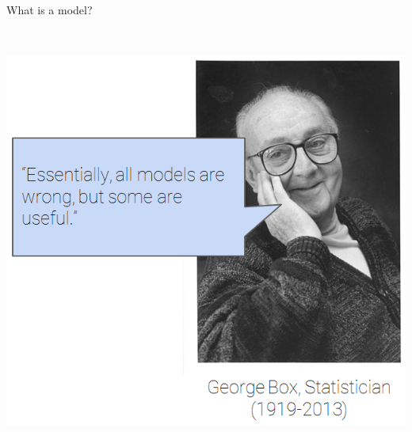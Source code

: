 \documentclass[aspectratio=169]{../latex_main/tntbeamer}  %
\begin{document}
\begin{frame}{What is a model?}
\begin{columns}
	        
	        \begin{column}{.5\textwidth}
	                    \vspace{-10mm}\\
	                    \includegraphics[scale=.4]{Bild2}
	        \end{column}
	    \end{columns}
	\end{frame}
	
	
	
\end{document}
